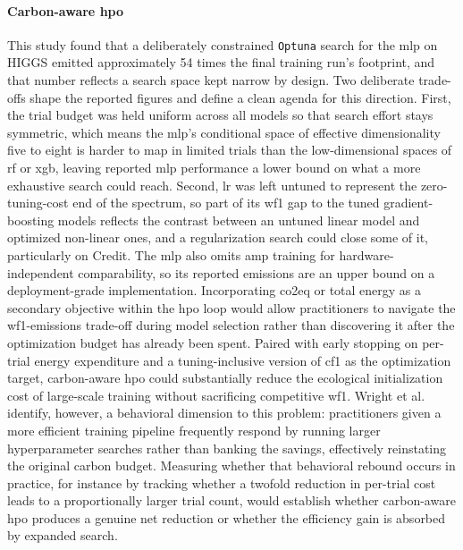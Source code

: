 \paragraph{Carbon-aware \gls{hpo}}
This study found that a deliberately constrained \texttt{Optuna} search for the \gls{mlp} on HIGGS emitted approximately 54 times the final training run's footprint, and that number reflects a search space kept narrow by design. Two deliberate trade-offs shape the reported figures and define a clean agenda for this direction. First, the trial budget was held uniform across all models so that search effort stays symmetric, which means the \gls{mlp}'s conditional space of effective dimensionality five to eight is harder to map in limited trials than the low-dimensional spaces of \gls{rf} or \gls{xgb}, leaving reported \gls{mlp} performance a lower bound on what a more exhaustive search could reach. Second, \gls{lr} was left untuned to represent the zero-tuning-cost end of the spectrum, so part of its \gls{wf1} gap to the tuned gradient-boosting models reflects the contrast between an untuned linear model and optimized non-linear ones, and a regularization search could close some of it, particularly on Credit. The \gls{mlp} also omits \gls{amp} training for hardware-independent comparability, so its reported emissions are an upper bound on a deployment-grade implementation. Incorporating \gls{co2eq} or total energy as a secondary objective within the \gls{hpo} loop would allow practitioners to navigate the \gls{wf1}-emissions trade-off during model selection rather than discovering it after the optimization budget has already been spent. Paired with early stopping on per-trial energy expenditure and a tuning-inclusive version of \gls{cf1} as the optimization target, carbon-aware \gls{hpo} could substantially reduce the ecological initialization cost of large-scale training without sacrificing competitive \gls{wf1}. Wright et al.\ \parencite{wrightEfficiencyNotEnough2025} identify, however, a behavioral dimension to this problem: practitioners given a more efficient training pipeline frequently respond by running larger hyperparameter searches rather than banking the savings, effectively reinstating the original carbon budget. Measuring whether that behavioral rebound occurs in practice, for instance by tracking whether a twofold reduction in per-trial cost leads to a proportionally larger trial count, would establish whether carbon-aware \gls{hpo} produces a genuine net reduction or whether the efficiency gain is absorbed by expanded search.


